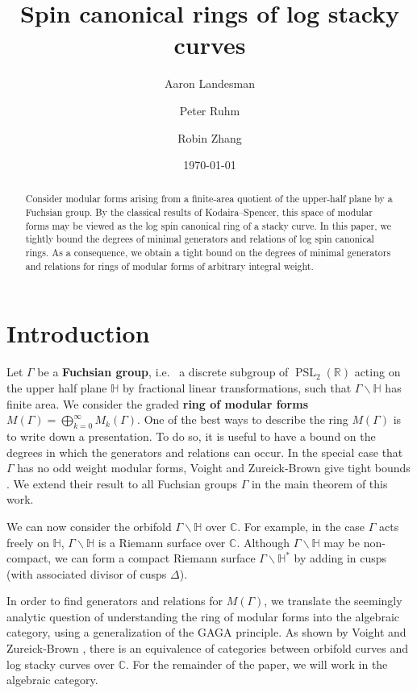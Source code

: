 \documentclass{amsart}
\title{Spin canonical rings of log stacky curves}
\author{Aaron Landesman}
\author{Peter Ruhm}
\author{Robin Zhang}
\date{\today}
\theoremstyle{plain}
\theoremstyle{definition}
\theoremstyle{remark}
\numberwithin{equation}{section}
\newcommand\BH{{\mathbb H}}
\newcommand\BC{{\mathbb C}}
\newcommand\BR{{\mathbb R}}
\newcommand{\PSL}{\operatorname{PSL}}
\begin{document}
\begin{abstract}
 	Consider modular forms arising from a finite-area quotient of the
	upper-half plane by a Fuchsian group. By the classical results of
	Kodaira--Spencer, this space of modular forms may be viewed as the
	log spin canonical ring of a stacky curve. In this paper, we
	tightly bound the degrees of minimal generators and relations of
	log spin canonical rings. As a consequence, we obtain a tight bound
	on the degrees of minimal generators and relations for rings of
	modular forms of arbitrary integral weight.
\end{abstract}

\maketitle


\section{Introduction}
Let $\Gamma$ be a {\bf Fuchsian group}, i.e.~ a discrete subgroup of
$\PSL_2(\BR)$ acting on the upper half plane $\BH$ by fractional
linear transformations, such that $\Gamma \backslash \BH$ has finite area.
We consider the graded {\bf ring of modular forms}
$M(\Gamma) = \bigoplus_{k = 0}^\infty M_k(\Gamma)$. One of the best ways to describe the ring $M(\Gamma)$ is to write down a presentation.
To do so, it is useful to have a bound on the
degrees in which the generators and relations can occur. In the
special case that $\Gamma$ has no odd weight modular forms, Voight
and Zureick-Brown give tight bounds \cite[Chapters 7-9]{vzb:stacky}.
We extend their result to all Fuchsian groups $\Gamma$ in the main
theorem of this work.

We can now consider the orbifold $\Gamma \backslash \BH$ over $\BC$.
For example, in the case $\Gamma$ acts freely on $\BH$, $\Gamma
\backslash \BH$ is a Riemann surface over $\BC$. 
Although $\Gamma \backslash \BH$ may be non-compact, we can form a
compact Riemann surface $\Gamma \backslash \BH^*$ by adding in
cusps (with associated divisor of cusps $\Delta$).

In order to find generators and relations for $M(\Gamma)$, we
translate the seemingly analytic question of understanding the ring
of modular forms into the algebraic category, using a
generalization of the GAGA principle.
As shown by Voight and Zureick-Brown \cite[Proposition 6.1.5]
{vzb:stacky}, there is an equivalence of categories between orbifold
curves and log stacky curves over $\BC$. For the remainder
of the paper, we will work in the algebraic category.
\end{document}
